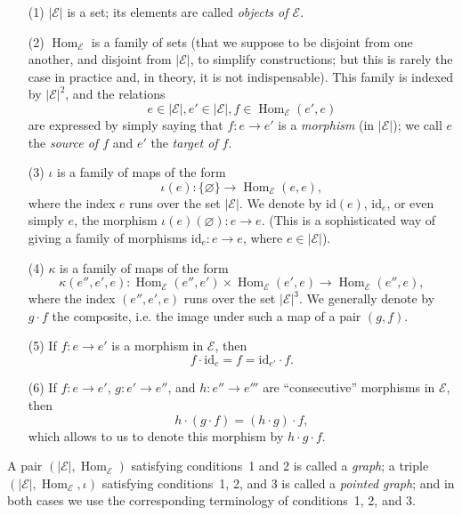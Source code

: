 \documentclass{article}
\newcommand{\oldpage}[1]{\marginpar{\footnotesize$\Big\vert$ \textit{p.~#1}}}
\newcommand{\id}{\mathrm{id}}
\newcommand{\cat}[1]{\mathcal{#1}}
\newcommand{\set}[1]{|#1|}
\DeclareMathOperator{\Hom}{Hom}
\begin{document}
\begin{enumerate}
  \item[(1)] $\set{\cat{E}}$ is a set; its elements are called \emph{objects of $\cat{E}$}.

  \item[(2)] $\Hom_\cat{E}$ is a family of sets (that we suppose to be disjoint from one another, and disjoint from $\set{\cat{E}}$, to simplify constructions; but this is rarely the case in practice and, in theory, it is not indispensable).
    This family is indexed by $\set{\cat{E}}^2$, and the relations
    \[
      e\in\set{\cat{E}},
      e'\in\set{\cat{E}},
      f\in\Hom_\cat{E}(e',e)
    \]
    are expressed by simply saying that $f\colon e\to e'$ is a \emph{morphism} (in $\set{\cat{E}}$);
    we call $e$ the \emph{source of $f$} and $e'$ the \emph{target of $f$}.

  \item[(3)] $\iota$ is a family of maps of the form
    \[
      \iota(e)\colon \{\varnothing\}
      \to \Hom_\cat{E}(e,e),
    \]
    where the index $e$ runs over the set $\set{\cat{E}}$.
    We denote by $\id(e)$, $\id_e$, or even simply $e$, the morphism $\iota(e)(\varnothing)\colon e\to e$.
    \oldpage{220}
    (This is a sophisticated way of giving a family of morphisms $\id_e\colon e\to e$, where $e\in\set{\cat{E}}$).

  \item[(4)] $\kappa$ is a family of maps of the form
    \[
      \kappa(e'',e',e)\colon
      \Hom_\cat{E}(e'',e')\times\Hom_\cat{E}(e',e)
      \to \Hom_\cat{E}(e'',e),
    \]
    where the index $(e'',e',e)$ runs over the set $\set{\cat{E}}^3$.
    We generally denote by $g\cdot f$ the composite, i.e. the image under such a map of a pair $(g,f)$.

  \item[(5)] If $f\colon e\to e'$ is a morphism in $\cat{E}$, then
    \[
      f\cdot\id_e
      = f
      = \id_{e'}\cdot f.
    \]

  \item[(6)] If $f\colon e\to e'$, $g\colon e'\to e''$, and $h\colon e''\to e'''$ are ``consecutive'' morphisms in $\cat{E}$, then
    \[
      h\cdot(g\cdot f)
      = (h\cdot g)\cdot f,
    \]
    which allows to us to denote this morphism by $h\cdot g\cdot f$.
\end{enumerate}

A pair $(\set{\cat{E}},\Hom_\cat{E})$ satisfying conditions~1 and 2 is called a \emph{graph}; a triple $(\set{\cat{E}},\Hom_\cat{E},\iota)$ satisfying conditions~1, 2, and 3 is called a \emph{pointed graph}; and in both cases we use the corresponding terminology of conditions~1, 2, and 3.
\end{document}
